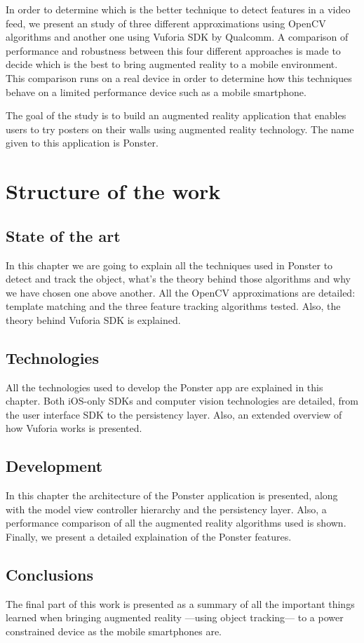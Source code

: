 In order to determine which is the better technique to detect features in a
video feed, we present
an study of three different approximations using OpenCV algorithms and another one
using Vuforia SDK by Qualcomm\textregistered. A comparison of performance and
robustness between this four different approaches is made to decide which is the
best to bring augmented reality to a mobile environment. This comparison runs
on a real device in order to determine how this techniques behave on a limited
performance device such as a mobile smartphone.

The goal of the study is to build an augmented reality application that enables 
users to try posters on their walls using augmented reality technology. The
name given to this application is Ponster.

\section*{Structure of the work}
\subsection*{State of the art}
In this chapter we are going to explain all the techniques used in Ponster to
detect and track the object, what's the theory behind those algorithms and why
we have chosen one above another. All the OpenCV approximations are detailed:
template matching and the three feature tracking algorithms tested. Also, the
theory behind Vuforia SDK is explained.

\subsection*{Technologies}
All the technologies used to develop the Ponster app are explained in this
chapter. Both iOS-only SDKs and computer vision technologies are detailed,
from the user interface SDK to the persistency layer. Also, an extended
overview of how Vuforia works is presented.

\subsection*{Development}
In this chapter the architecture of the Ponster application is presented, along
with the model view controller hierarchy and the persistency layer. Also, a
performance comparison of all the augmented reality algorithms used is
shown. Finally, we present a detailed explaination of the Ponster features.

\subsection*{Conclusions}
The final part of this work is presented as a summary of all the important
things learned when bringing augmented reality ---using object tracking--- to a
power constrained device as the mobile smartphones are.
